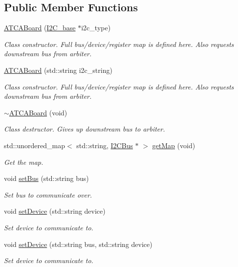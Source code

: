 \subsection*{Public Member Functions}
\begin{DoxyCompactItemize}
\item 
\hyperlink{class_a_t_c_a_board_a4046dcaa2d61102e91005f2845e06201}{A\+T\+C\+A\+Board} (\hyperlink{class_i2_c__base}{I2\+C\+\_\+base} $\ast$i2c\+\_\+type)
\begin{DoxyCompactList}\small\item\em Class constructor. Full bus/device/register map is defined here. Also requests downstream bus from arbiter. \end{DoxyCompactList}\item 
\hyperlink{class_a_t_c_a_board_ac8d07dfe60a49f07a94a09868dc3637b}{A\+T\+C\+A\+Board} (std\+::string i2c\+\_\+string)
\begin{DoxyCompactList}\small\item\em Class constructor. Full bus/device/register map is defined here. Also requests downstream bus from arbiter. \end{DoxyCompactList}\item 
\hyperlink{class_a_t_c_a_board_a4f51f5462bd42562a1cdd20eb3a3bfeb}{$\sim$\+A\+T\+C\+A\+Board} (void)
\begin{DoxyCompactList}\small\item\em Class destructor. Gives up downstream bus to arbiter. \end{DoxyCompactList}\item 
std\+::unordered\+\_\+map$<$ std\+::string, \hyperlink{class_i2_c_bus}{I2\+C\+Bus} $\ast$ $>$ \hyperlink{class_a_t_c_a_board_a3926d4c4f9e4b98640b9b902b88ecb22}{get\+Map} (void)
\begin{DoxyCompactList}\small\item\em Get the map. \end{DoxyCompactList}\item 
void \hyperlink{class_a_t_c_a_board_a7aeb3e3e9488e3e016bc844b3eb0f36b}{set\+Bus} (std\+::string bus)
\begin{DoxyCompactList}\small\item\em Set bus to communicate over. \end{DoxyCompactList}\item 
void \hyperlink{class_a_t_c_a_board_ad0395aa7fe27ed6602ea55dfbe10b24d}{set\+Device} (std\+::string device)
\begin{DoxyCompactList}\small\item\em Set device to communicate to. \end{DoxyCompactList}\item 
void \hyperlink{class_a_t_c_a_board_ac7e7f32ba0c3583b67d8fa0c6a4703b7}{set\+Device} (std\+::string bus, std\+::string device)
\begin{DoxyCompactList}\small\item\em Set device to communicate to. \end{DoxyCompactList}\end{DoxyCompactItemize}
